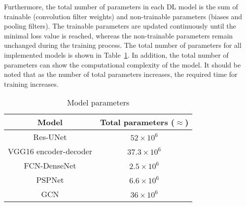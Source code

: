 
Furthermore, the total number of parameters in each DL model is the sum of trainable (convolution filter weights) and non-trainable parameters (biases and pooling filters).
The trainable parameters are updated continuously until the minimal loss value is reached, whereas the non-trainable parameters remain unchanged during the training process.
The total number of parameters for all implemented models is shown in Table~\ref{tab:table_parameters}.
In addition, the total number of parameters can show the computational complexity of the model.
It should be noted that as the number of total parameters increases, the required time for training increases.
\begin{table}[]
	\centering
	\caption{Model parameters}
	\label{tab:table_parameters}
	\begin{tabular}{cc}\hline
		Model & Total parameters (\(\approx\)) \\ \hline
		Res-UNet & \(52\times 10^6\) \\ 
		VGG16 encoder-decoder & \(37.3\times 10^6\) \\
		FCN-DenseNet & \(2.5\times 10^6\) \\ 
		PSPNet & \(6.6\times 10^6\) \\ 
		GCN & \(36\times 10^6\) \\ \hline
	\end{tabular}
\end{table}
